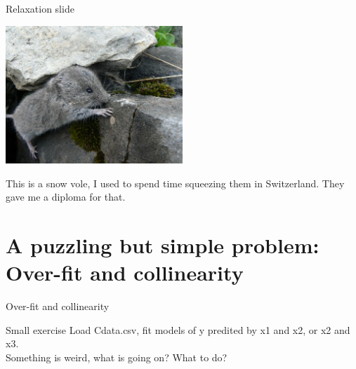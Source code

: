 \documentclass[10pt]{beamer}\usepackage[]{graphicx}\usepackage[]{color}
\begin{document}
\begin{frame}{Relaxation slide}
  \begin{center}
    \includegraphics[width=0.5\textwidth]{Figures/brain.jpg}
  \end{center}
  This is a snow vole, I used to spend time squeezing them in Switzerland. They gave me a diploma for that.
\end{frame}

\section{A puzzling but simple problem: Over-fit and collinearity}

\begin{frame}[fragile]{Over-fit and collinearity}
\begin{alertblock}{Small exercise}
Load Cdata.csv, fit models of y predited by x1 and x2, or x2 and x3.\\ Something is weird, what is going on? What to do?
\end{alertblock}





\end{frame}
\end{document}
